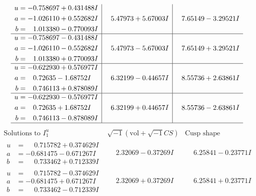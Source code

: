 \documentclass[1p]{elsarticle_modified}
\theoremstyle{definition}
\newcommand{\I}{\sqrt{-1}}
\begin{document}
$$\begin{array}{c|c|c}
\begin{aligned}
u &= -0.758697 + 0.431488 I \\
a &= -1.026110 + 0.552682 I \\
b &= \phantom{-}1.013380 - 0.770093 I\end{aligned}
 & \phantom{-}5.47973 + 5.67003 I & \phantom{-}7.65149 - 3.29521 I \\ \hline\begin{aligned}
u &= -0.758697 - 0.431488 I \\
a &= -1.026110 - 0.552682 I \\
b &= \phantom{-}1.013380 + 0.770093 I\end{aligned}
 & \phantom{-}5.47973 - 5.67003 I & \phantom{-}7.65149 + 3.29521 I \\ \hline\begin{aligned}
u &= -0.622930 + 0.576977 I \\
a &= \phantom{-}0.72635 - 1.68752 I \\
b &= \phantom{-}0.746113 + 0.878089 I\end{aligned}
 & \phantom{-}6.32199 - 0.44657 I & \phantom{-}8.55736 + 2.63861 I \\ \hline\begin{aligned}
u &= -0.622930 - 0.576977 I \\
a &= \phantom{-}0.72635 + 1.68752 I \\
b &= \phantom{-}0.746113 - 0.878089 I\end{aligned}
 & \phantom{-}6.32199 + 0.44657 I & \phantom{-}8.55736 - 2.63861 I\\
 \hline 
 \end{array}$$\newpage$$\begin{array}{c|c|c}  
\text{Solutions to }I^u_{1}& \I (\text{vol} + \sqrt{-1}CS) & \text{Cusp shape}\\
 \hline 
\begin{aligned}
u &= \phantom{-}0.715782 + 0.374629 I \\
a &= -0.681475 - 0.671267 I \\
b &= \phantom{-}0.733462 + 0.712339 I\end{aligned}
 & \phantom{-}2.32069 - 0.37269 I & \phantom{-}6.25841 - 0.23771 I \\ \hline\begin{aligned}
u &= \phantom{-}0.715782 - 0.374629 I \\
a &= -0.681475 + 0.671267 I \\
b &= \phantom{-}0.733462 - 0.712339 I\end{aligned}
 & \phantom{-}2.32069 + 0.37269 I & \phantom{-}6.25841 + 0.23771 I \\ \hline\begin{aligned}

\end{aligned}
\end{array}$$
\end{document}
